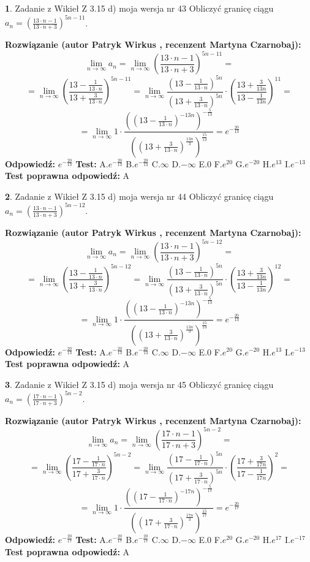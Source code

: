 \documentclass[12pt, a4paper]{article}
\theoremstyle{definition} %
\newtheorem{zad}{}
\newcommand{\zadStart}[1]{\begin{zad}#1\newline}
\newcommand{\zadStop}{\end{zad}}
\newcommand{\rozwStart}[2]{\noindent \textbf{Rozwiązanie (autor #1 , recenzent #2): }\newline}
\newcommand{\rozwStop}{\newline}
\newcommand{\odpStart}{\noindent \textbf{Odpowiedź:}\newline}
\newcommand{\odpStop}{\newline}
\newcommand{\testStart}{\noindent \textbf{Test:}\newline}
\newcommand{\testStop}{\newline}
\newcommand{\kluczStart}{\noindent \textbf{Test poprawna odpowiedź:}\newline}
\newcommand{\kluczStop}{\newline}
\begin{document}
\zadStart{Zadanie z Wikieł Z 3.15 d) moja wersja nr 43}
Obliczyć granicę ciągu $a_{n}=(\frac{13\cdot n - 1}{13 \cdot n + 3})^{5n-11}$.
\zadStop
\rozwStart{Patryk Wirkus}{Martyna Czarnobaj}
$$\lim\limits_{n\to\infty} a_{n} = \lim\limits_{n\to\infty}(\frac{13\cdot n - 1}{13 \cdot n + 3})^{5n-11}=$$
$$=\lim\limits_{n\to\infty}(\frac{13 - \frac{1}{13\cdot n}}{13 + \frac{3}{13 \cdot n}})^{5n-11}=\lim\limits_{n\to\infty}\frac{(13 - \frac{1}{13\cdot n})^{5n}}{(13 + \frac{3}{13\cdot n})^{5n}} \cdot (\frac{13+\frac{3}{13n}}{13-\frac{1}{13n}})^{11}=$$
$$=\lim\limits_{n\to\infty} 1 \cdot \frac{((13-\frac{1}{13 \cdot n})^{-13n})^{-\frac{5}{13}}}{((13+\frac{3}{13 \cdot n})^{\frac{13n}{3}})^{\frac{15}{13}}} =e^{-\frac{20}{13}}$$
\rozwStop
\odpStart
$e^{-\frac{20}{13}}$
\odpStop
\testStart
A.$ e^{-\frac{20}{13}}$
B.$ e^{-\frac{20}{13}}$
C.$\infty$
D.$-\infty$
E.$0$
F.$e^{20}$
G.$e^{-20}$
H.$e^{13}$
I.$e^{-13}$
\testStop
\kluczStart
A
\kluczStop



\zadStart{Zadanie z Wikieł Z 3.15 d) moja wersja nr 44}
Obliczyć granicę ciągu $a_{n}=(\frac{13\cdot n - 1}{13 \cdot n + 3})^{5n-12}$.
\zadStop
\rozwStart{Patryk Wirkus}{Martyna Czarnobaj}
$$\lim\limits_{n\to\infty} a_{n} = \lim\limits_{n\to\infty}(\frac{13\cdot n - 1}{13 \cdot n + 3})^{5n-12}=$$
$$=\lim\limits_{n\to\infty}(\frac{13 - \frac{1}{13\cdot n}}{13 + \frac{3}{13 \cdot n}})^{5n-12}=\lim\limits_{n\to\infty}\frac{(13 - \frac{1}{13\cdot n})^{5n}}{(13 + \frac{3}{13\cdot n})^{5n}} \cdot (\frac{13+\frac{3}{13n}}{13-\frac{1}{13n}})^{12}=$$
$$=\lim\limits_{n\to\infty} 1 \cdot \frac{((13-\frac{1}{13 \cdot n})^{-13n})^{-\frac{5}{13}}}{((13+\frac{3}{13 \cdot n})^{\frac{13n}{3}})^{\frac{15}{13}}} =e^{-\frac{20}{13}}$$
\rozwStop
\odpStart
$e^{-\frac{20}{13}}$
\odpStop
\testStart
A.$ e^{-\frac{20}{13}}$
B.$ e^{-\frac{20}{13}}$
C.$\infty$
D.$-\infty$
E.$0$
F.$e^{20}$
G.$e^{-20}$
H.$e^{13}$
I.$e^{-13}$
\testStop
\kluczStart
A
\kluczStop



\zadStart{Zadanie z Wikieł Z 3.15 d) moja wersja nr 45}
Obliczyć granicę ciągu $a_{n}=(\frac{17\cdot n - 1}{17 \cdot n + 3})^{5n-2}$.
\zadStop
\rozwStart{Patryk Wirkus}{Martyna Czarnobaj}
$$\lim\limits_{n\to\infty} a_{n} = \lim\limits_{n\to\infty}(\frac{17\cdot n - 1}{17 \cdot n + 3})^{5n-2}=$$
$$=\lim\limits_{n\to\infty}(\frac{17 - \frac{1}{17\cdot n}}{17 + \frac{3}{17 \cdot n}})^{5n-2}=\lim\limits_{n\to\infty}\frac{(17 - \frac{1}{17\cdot n})^{5n}}{(17 + \frac{3}{17\cdot n})^{5n}} \cdot (\frac{17+\frac{3}{17n}}{17-\frac{1}{17n}})^{2}=$$
$$=\lim\limits_{n\to\infty} 1 \cdot \frac{((17-\frac{1}{17 \cdot n})^{-17n})^{-\frac{5}{17}}}{((17+\frac{3}{17 \cdot n})^{\frac{17n}{3}})^{\frac{15}{17}}} =e^{-\frac{20}{17}}$$
\rozwStop
\odpStart
$e^{-\frac{20}{17}}$
\odpStop
\testStart
A.$ e^{-\frac{20}{17}}$
B.$ e^{-\frac{20}{17}}$
C.$\infty$
D.$-\infty$
E.$0$
F.$e^{20}$
G.$e^{-20}$
H.$e^{17}$
I.$e^{-17}$
\testStop
\kluczStart
A
\kluczStop
\end{document}
